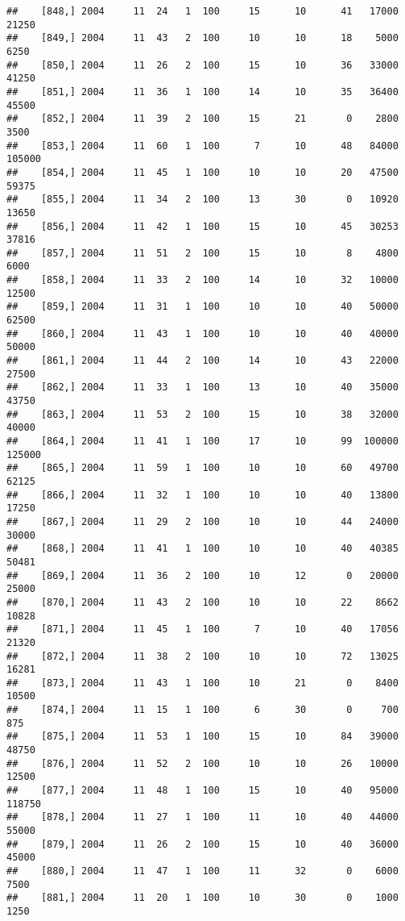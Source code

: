 \documentclass{article}\usepackage[]{graphicx}\usepackage[]{color}
\makeatletter
\newenvironment{kframe}{%
 \def\at@end@of@kframe{}%
 \ifinner\ifhmode%
  \def\at@end@of@kframe{\end{minipage}}%
  \begin{minipage}{\columnwidth}%
 \fi\fi%
 \def\FrameCommand##1{\hskip\@totalleftmargin \hskip-\fboxsep
 \colorbox{shadecolor}{##1}\hskip-\fboxsep
     \hskip-\linewidth \hskip-\@totalleftmargin \hskip\columnwidth}%
 \MakeFramed {\advance\hsize-\width
   \@totalleftmargin\z@ \linewidth\hsize
   \@setminipage}}%
 {\par\unskip\endMakeFramed%
 \at@end@of@kframe}
\newenvironment{knitrout}{}{} %
\makeatother
\begin{document}
\begin{knitrout}
\begin{kframe}
\begin{verbatim}
##    [848,] 2004     11  24   1  100     15      10      41   17000   21250
##    [849,] 2004     11  43   2  100     10      10      18    5000    6250
##    [850,] 2004     11  26   2  100     15      10      36   33000   41250
##    [851,] 2004     11  36   1  100     14      10      35   36400   45500
##    [852,] 2004     11  39   2  100     15      21       0    2800    3500
##    [853,] 2004     11  60   1  100      7      10      48   84000  105000
##    [854,] 2004     11  45   1  100     10      10      20   47500   59375
##    [855,] 2004     11  34   2  100     13      30       0   10920   13650
##    [856,] 2004     11  42   1  100     15      10      45   30253   37816
##    [857,] 2004     11  51   2  100     15      10       8    4800    6000
##    [858,] 2004     11  33   2  100     14      10      32   10000   12500
##    [859,] 2004     11  31   1  100     10      10      40   50000   62500
##    [860,] 2004     11  43   1  100     10      10      40   40000   50000
##    [861,] 2004     11  44   2  100     14      10      43   22000   27500
##    [862,] 2004     11  33   1  100     13      10      40   35000   43750
##    [863,] 2004     11  53   2  100     15      10      38   32000   40000
##    [864,] 2004     11  41   1  100     17      10      99  100000  125000
##    [865,] 2004     11  59   1  100     10      10      60   49700   62125
##    [866,] 2004     11  32   1  100     10      10      40   13800   17250
##    [867,] 2004     11  29   2  100     10      10      44   24000   30000
##    [868,] 2004     11  41   1  100     10      10      40   40385   50481
##    [869,] 2004     11  36   2  100     10      12       0   20000   25000
##    [870,] 2004     11  43   2  100     10      10      22    8662   10828
##    [871,] 2004     11  45   1  100      7      10      40   17056   21320
##    [872,] 2004     11  38   2  100     10      10      72   13025   16281
##    [873,] 2004     11  43   1  100     10      21       0    8400   10500
##    [874,] 2004     11  15   1  100      6      30       0     700     875
##    [875,] 2004     11  53   1  100     15      10      84   39000   48750
##    [876,] 2004     11  52   2  100     10      10      26   10000   12500
##    [877,] 2004     11  48   1  100     15      10      40   95000  118750
##    [878,] 2004     11  27   1  100     11      10      40   44000   55000
##    [879,] 2004     11  26   2  100     15      10      40   36000   45000
##    [880,] 2004     11  47   1  100     11      32       0    6000    7500
##    [881,] 2004     11  20   1  100     10      30       0    1000    1250

\end{verbatim}
\end{kframe}
\end{knitrout}
\end{document}
